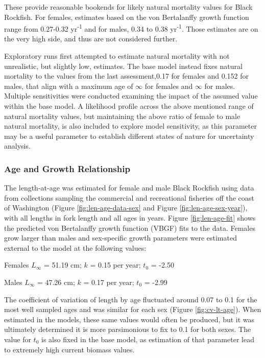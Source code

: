 \documentclass[11pt,
  english,
  letterpaper,
]{article}
\begin{document}
These provide reasonable bookends for likely natural mortality values for Black Rockfish. For females, estimates based on the von Bertalanffy growth function range from 0.27-0.32 yr\textsuperscript{-1} and for males, 0.34 to 0.38 yr\textsuperscript{-1}. Those estimates are on the very high side, and thus are not considered further.

Exploratory runs first attempted to estimate natural mortality with not unrealistic, but slightly low, estimates. The base model instead fixes natural mortality to the values from the last assessment,0.17 for females and 0.152 for males, that align with a maximum age of \ensuremath{\infty{}} for females and \ensuremath{\infty{}} for males. Multiple sensitivities were conducted examining the impact of the assumed value within the base model. A likelihood profile across the above mentioned range of natural mortality values, but maintaining the above ratio of female to male natural mortality, is also included to explore model sensitivity, as this parameter may be a useful parameter to establish different states of nature for uncertainty analysis.

\hypertarget{age-and-growth-relationship}{%
\subsubsection{Age and Growth Relationship}\label{age-and-growth-relationship}}

The length-at-age was estimated for female and male Black Rockfish using data from collections sampling the commercial and recreational fisheries off the coast of Washington (Figure \ref{fig:len-age-data-sex} and Figure \ref{fig:len-age-sex-year}), with all lengths in fork length and all ages in years. Figure \ref{fig:len-age-fit} shows the predicted von Bertalanffy growth function (VBGF) fits to the data. Females grow larger than males and sex-specific growth parameters were estimated external to the model at the following values:

\begin{centering}

Females $L_{\infty}$ = 51.19 cm; $k$ = 0.15 per year; $t_0$ = -2.50

Males $L_{\infty}$ = 47.26 cm; $k$ = 0.17 per year; $t_0$ = -2.99

\end{centering}

\vspace{0.5cm}

The coefficient of variation of length by age fluctuated around 0.07 to 0.1 for the most well sampled ages and was similar for each sex (Figure \ref{fig:cv-lt-age}). When estimated in the models, these same values would often be produced, but it was ultimately determined it is more parsimonious to fix to 0.1 for both sexes. The value for \(t_0\) is also fixed in the base model, as estimation of that parameter lead to extremely high current biomass values.
\end{document}
